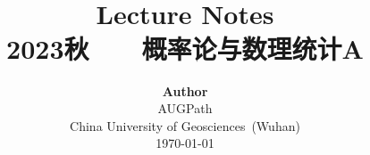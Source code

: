\title{ \normalsize \textsc{}
		\\ [2.0cm]
		\HRule{1.5pt} \\
		\LARGE \textbf{{Lecture Notes}
		\HRule{2.0pt} \\ [0.6cm] \LARGE{2023秋 ~~~概率论与数理统计A} \vspace*{10\baselineskip}}
		}
\date{}
\author{\textbf{Author} \\ 
		AUGPath \\
		China University of Geosciences~(Wuhan) \\
		\today}

\maketitle
\newpage
\setcounter{tocdepth}{1}
\tableofcontents
\newpage
